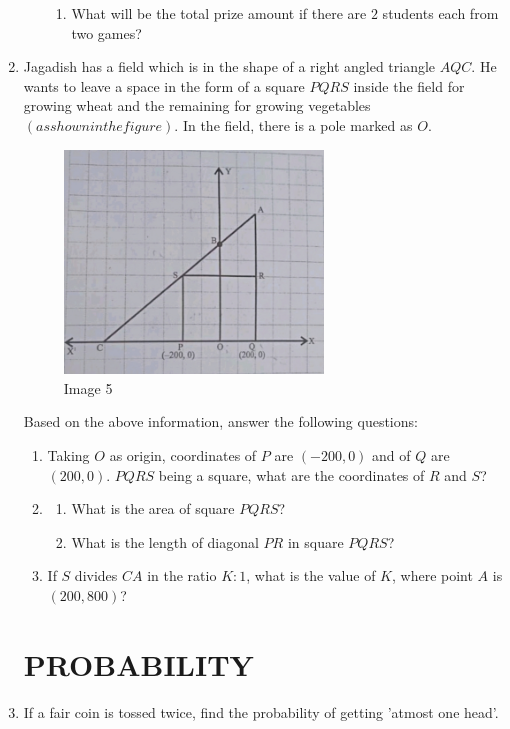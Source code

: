\documentclass[12pt,-letter paper]{article}
\providecommand{\brak}[1]{\ensuremath{\left(#1\right)}}
\begin{document}
\begin{enumerate}
\begin{enumerate}
\begin{enumerate}
\item
What will be the total prize amount if there are $2$ students each from two games?
\end{enumerate}
\end{enumerate}
\newpage
\item
Jagadish has a field which is in the shape of a right angled triangle $AQC$. He wants to leave a space in the form of a square $PQRS$ inside the field for growing wheat and the remaining for growing vegetables \brak{as shown in the figure}. In the field, there is a pole marked as $O$.
\begin{figure}[h!]
\centering
\includegraphics[width=0.65\textwidth]{img5.jpg}
\caption{Image 5}
\end{figure}
Based on the above information, answer the following questions:
\begin{enumerate}
\item
Taking $O$ as origin, coordinates of $P$ are \brak{-200,0} and of $Q$ are \brak{200,0}. $PQRS$ being a square, what are the coordinates of $R$ and $S$?
\item
\begin{enumerate}
\item
What is the area of square $PQRS$?
\item
What is the length of diagonal $PR$ in square $PQRS$?
\end{enumerate}
\item
If $S$ divides $CA$ in the ratio $K:1$, what is the value of $K$, where point $A$ is \brak{200,800}?
\end{enumerate}
\section*{PROBABILITY}
\item
If a fair coin is tossed twice, find the probability of getting 'atmost one head'.

\end{enumerate}
\end{document}
